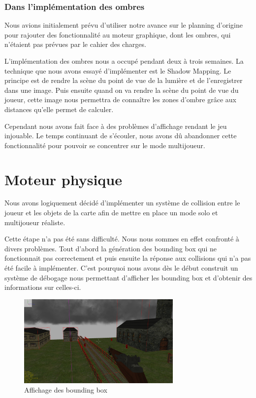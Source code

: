 \documentclass[11pt]{report}
\begin{document}
\subsection{Dans l'implémentation des ombres}

Nous avions initialement prévu d'utiliser notre avance sur le planning d'origine pour rajouter des fonctionnalité au moteur graphique, dont les ombres, qui n'étaient pas prévues par le cahier des charges.

L'implémentation des ombres nous a occupé pendant deux à trois semaines. La technique que nous avons essayé d'implémenter est le Shadow Mapping. Le principe est de rendre la scène du point de vue de la lumière et de l'enregistrer dans une image. Puis ensuite quand on va rendre la scène du point de vue du joueur, cette image nous permettra de connaître les zones d'ombre grâce aux distances qu'elle permet de calculer.

Cependant nous avons fait face à des problèmes d'affichage rendant le jeu injouable. Le temps continuant de s'écouler, nous avons dû abandonner cette fonctionnalité pour pouvoir se concentrer sur le mode multijoueur.

\chapter{Moteur physique}

Nous avons logiquement décidé d’implémenter un système de collision entre le joueur et les objets de la carte afin de mettre en place un mode solo et multijoueur réaliste.

Cette étape n'a pas été sans difficulté. Nous nous sommes en effet confronté à divers problèmes. Tout d'abord la génération des bounding box qui ne fonctionnait pas correctement et puis ensuite la réponse aux collisions qui n'a pas été facile à implémenter. C'est pourquoi nous avons dès le début construit un système de débogage nous permettant d'afficher les bounding box et d'obtenir des informations sur celles-ci.

\begin{figure}[htbp]
\centering
\includegraphics[width=8cm]{affichage-box.png}
\caption{Affichage des bounding box}
\end{figure}
\end{document}
